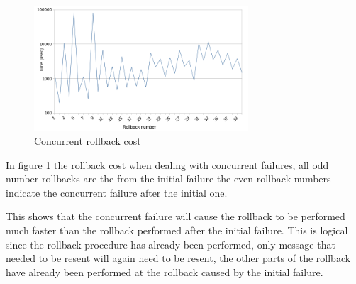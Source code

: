 \documentclass[twocolumn, a4paper,11pt]{article}%
\begin{document}
\par
\begin{figure}[h]
	\includegraphics[width=8cm]{concurrent_rollback_cost_new.png}
	\caption{Concurrent rollback cost}
	\label{fig:concurrent_rollback}
\end{figure}\noindent
In figure \ref{fig:concurrent_rollback} the rollback cost when dealing with concurrent failures, all odd  number rollbacks are the from the initial failure the even rollback numbers indicate the concurrent failure after the initial one.
\par This shows that the concurrent failure will cause the rollback to be performed much faster than the rollback performed after the initial failure. This is logical since the rollback procedure has already been performed, only message that needed to be resent will again need to be resent, the other parts of the rollback have already been performed at the rollback caused by the initial failure.
\end{document}
